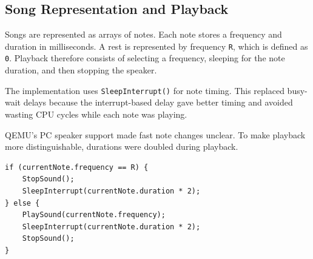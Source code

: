 \subsection{Song Representation and Playback}
Songs are represented as arrays of notes. Each note stores a frequency and duration in milliseconds. A rest is represented by frequency \texttt{R}, which is defined as \texttt{0}. Playback therefore consists of selecting a frequency, sleeping for the note duration, and then stopping the speaker.

The implementation uses \texttt{SleepInterrupt()} for note timing. This replaced busy-wait delays because the interrupt-based delay gave better timing and avoided wasting CPU cycles while each note was playing.

QEMU's PC speaker support made fast note changes unclear. To make playback more distinguishable, durations were doubled during playback.

\begin{listing}[H]
\begin{verbatim}
if (currentNote.frequency == R) {
    StopSound();
    SleepInterrupt(currentNote.duration * 2);
} else {
    PlaySound(currentNote.frequency);
    SleepInterrupt(currentNote.duration * 2);
    StopSound();
}
\end{verbatim}
\caption{Song playback using rests, PC speaker tones, and interrupt-based timing.}
\end{listing}
\clearpage

